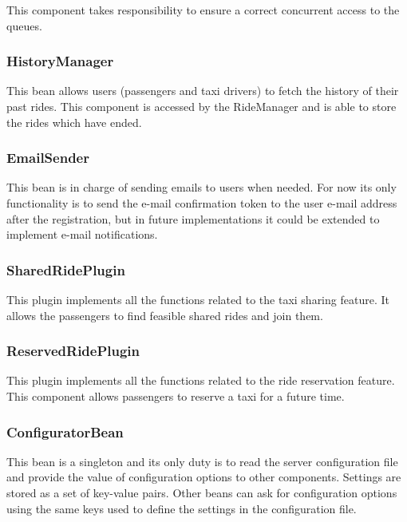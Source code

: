 This component takes responsibility to ensure a correct concurrent access to the queues.

\subsubsection{HistoryManager}
This bean allows users (passengers and taxi drivers) to fetch the history of their past rides.
This component is accessed by the RideManager and is able to store the rides which have ended.

\subsubsection{EmailSender}
This bean is in charge of sending emails to users when needed.
For now its only functionality is to send the e-mail confirmation token to the user e-mail address after the registration, but in future implementations it could be extended to implement e-mail notifications.

\subsubsection{SharedRidePlugin}
This plugin implements all the functions related to the taxi sharing feature.
It allows the passengers to find feasible shared rides and join them.

\subsubsection{ReservedRidePlugin}
This plugin implements all the functions related to the ride reservation feature.
This component allows passengers to reserve a taxi for a future time.

\subsubsection{ConfiguratorBean}
This bean is a singleton and its only duty is to read the server configuration file and provide the value of configuration options to other components.
Settings are stored as a set of key-value pairs.
Other beans can ask for configuration options using the same keys used to define the settings in the configuration file.

